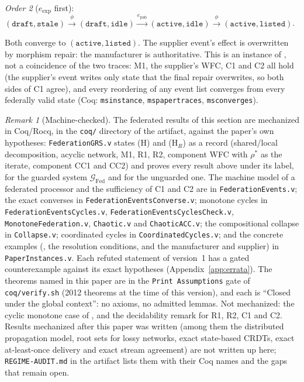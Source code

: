 \documentclass[11pt,a4paper]{article}
\theoremstyle{plain}
\theoremstyle{definition}
\theoremstyle{remark}
\newtheorem{remark}[theorem]{Remark}
\newcommand{\Fed}{\mathrm{Fed}}
\renewcommand{\_}{\textunderscore\allowbreak}
\begin{document}
\emph{Order 2} ($e_{\mathrm{exp}}$ first):
$(\texttt{draft}, \texttt{stale}) \xrightarrow{\phi}
(\texttt{draft}, \texttt{idle}) \xrightarrow{e_{\mathrm{pub}}}
(\texttt{active}, \texttt{idle}) \xrightarrow{\phi}
(\texttt{active}, \texttt{listed})$.

Both converge to $(\texttt{active}, \texttt{listed})$.  The supplier event's
effect is overwritten by morphism repair: the manufacturer is authoritative.
This is an instance of , not a coincidence of the two
traces: M1, the supplier's WFC, C1 and C2 all hold (the supplier's event writes
only state that the final repair overwrites, so both sides of C1 agree), and
every reordering of any event list converges from every federally valid state
(Coq: \texttt{ms\_instance}, \texttt{ms\_paper\_traces}, \texttt{ms\_converges}).

\begin{remark}[Machine-checked]
\label{rem:fed-mechanized}
The federated results of this section are mechanized in Coq/Rocq, in the
\texttt{coq/} directory of the artifact, against the paper's own hypotheses:
\texttt{FederationGRS.v} states (H) and (H$_R$) as a record (shared/local
decomposition, acyclic network, M1, R1, R2, component WFC with $\rho^*$ as the
iterate, component CC1 and CC2) and proves every result above under its label,
for the guarded system $\mathcal{G}_\Fed$ and for the unguarded one.  The
machine model of a federated processor and the sufficiency of C1 and C2 are in
\texttt{FederationEvents.v}; the exact converses in
\texttt{FederationEventsConverse.v}; monotone cycles in
\texttt{FederationEventsCycles.v}, \texttt{FederationEventsCyclesCheck.v},
\texttt{MonotoneFederation.v}, \texttt{Chaotic.v} and \texttt{ChaoticACC.v};
the compositional collapse in \texttt{Collapse.v}; coordinated cycles in
\texttt{CoordinatedCycles.v}; and the concrete examples
(, the resolution conditions, and
the manufacturer and supplier) in \texttt{PaperInstances.v}.  Each refuted
statement of version~1 has a gated counterexample against its exact hypotheses
(Appendix~\ref{app:errata}).  The theorems named in this paper are in the
\texttt{Print Assumptions} gate of \texttt{coq/verify.sh} (2012 theorems at the time of this version), and each is ``Closed under the global context'': no
axioms, no admitted lemmas.  Not mechanized: the cyclic monotone case of , and the
decidability remark for R1, R2, C1 and C2.  Results mechanized after this paper
was written (among them the distributed propagation model, root sets for lossy
networks, exact state-based CRDTs, exact at-least-once delivery and exact
stream agreement) are not written up here; \texttt{REGIME-AUDIT.md} in the
artifact lists them with their Coq names and the gaps that remain open.
\end{remark}
\end{document}
